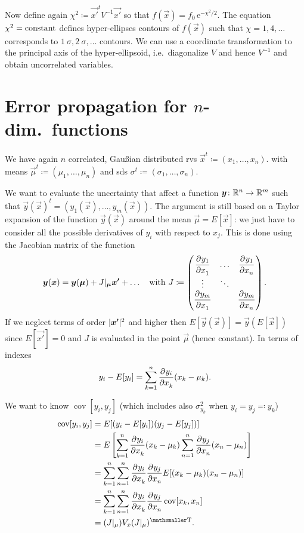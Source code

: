 \documentclass[
	10pt,
	draft
]{scrreprt}
\newcommand{\transpose}[1]{\ensuremath{#1}^{\mathrm{ \mathsmaller T}}}
\newcommand{\eu}{\ensuremath{\mathrm{e}}}
\DeclareMathOperator{\cov}{cov}
\newcommand{\pderiv}[3][]{\dfrac{{\de^{#1}}#2}{\de #3^{#1}}}%
\begin{document}
Now define again $\chi^2 \coloneqq\vec{x'}^tV^{-1}\vec{x'}$ so that $f(\vec{x}) = f_0\,\eu^{-\chi^2\!/2}$.
The equation $\chi^2 = \textup{constant}$ defines hyper-ellipses contours of $f(\vec{x})$ such that $\chi = 1,4,\dots$ corresponds to $\SI{1}{\sigma},\SI{2}{\sigma},\dots$ contours.
We can use a coordinate transformation to the principal axis of the hyper-ellipsoid, i.e.~diagonalize $V$ and hence $V^{-1}$ and obtain uncorrelated variables.

	\section{Error propagation for $n$-dim.~functions}

We have again $n$ correlated, Gau\ss{}ian distributed \acp{rv} $\vec{x}^t \coloneqq(x_1,\dots,x_n)$. with means $\vec{\mu}^t\coloneqq (\mu_1,\dots,\mu_n)$ and \acp{sd} $\sigma^t \coloneqq (\sigma_1,\dots,\sigma_n)$.


We want to evaluate the uncertainty that affect a function $\bm{{y}}\colon \mathbb{R}^n\to\mathbb{R}^m$ such that $\vec{y}(\vec{x})^t = (y_1(\vec{x}),\dots,y_m(\vec{x}))$.
The argument is still based on a Taylor expansion of the function $\vec{y}(\vec{x})$ around the mean $\vec{\mu} = E[\vec{x}]$: we just have to consider all the possible derivatives of $y_i$ with respect to $x_j$.
This is done using the Jacobian matrix of the function
\begin{equation}
\vec{y}(\vec{x}) = \vec{y}(\vec{\mu}) + J|_{\vec{\mu}}\vec{x'} + \dots{}
\quad
\text{with }
J\coloneqq
\begin{pmatrix}
\pderiv{y_1}{x_1} &\dots &\pderiv{y_1}{x_n}\\
\vdots &\ddots &\\
\pderiv{y_m}{x_1} & &\pderiv{y_m}{x_n}\\
\end{pmatrix}.
\end{equation}
If we neglect terms of order $\lvert\bm{{x'}}\rvert^2$ and higher then $E[\vec{y}(\vec{x})] = \vec{y}(E[\vec{x}])$ since $E[\vec{x'}] = 0$ and $J$ is evaluated in the point $\vec{\mu}$ (hence constant).
In terms of indexes
\begin{equation}
y_i - E[y_i] = \sum_{k=1}^n\pderiv{y_i}{x_k}(x_k - \mu_k).
\end{equation}


We want to know $\cov[y_i,y_j]$ (which includes also $\sigma_{y_k}^2$ when $y_i = y_j \eqqcolon y_k$)
\begin{equation}
\begin{aligned}
\cov[y_i,y_j]
&= E[(y_i - E[y_i])(y_j - E[y_j])] \\
&= E\left[ \sum_{k=1}^n\pderiv{y_i}{x_k}(x_k - \mu_k) \sum_{n=1}^n\pderiv{y_j}{x_n}(x_n - \mu_n)\right] \\
&= \sum_{k=1}^n\sum_{n=1}^n\pderiv{y_i}{x_k}\pderiv{y_j}{x_n} E[(x_k - \mu_k)(x_n - \mu_n)]\\
&= \sum_{k=1}^n\sum_{n=1}^n\pderiv{y_i}{x_k}\pderiv{y_j}{x_n} \cov[x_k,x_n]\\
&= (J\rvert_\mu) V_x \transpose{(J\rvert_\mu)}.
\end{aligned}
\end{equation}
\end{document}
